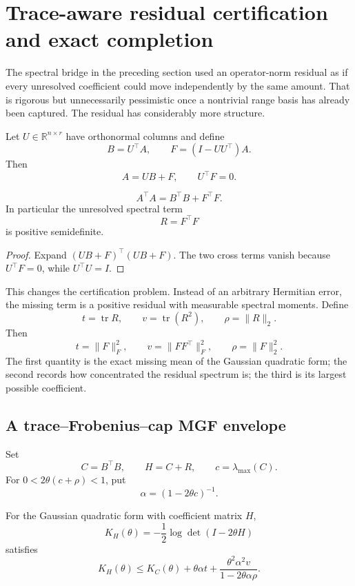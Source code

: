 \section{Trace-aware residual certification and exact completion}

The spectral bridge in the preceding section used an operator-norm residual as
if every unresolved coefficient could move independently by the same amount.
That is rigorous but unnecessarily pessimistic once a nontrivial range basis
has already been captured.  The residual has considerably more structure.

Let \(U\in\mathbb R^{n\times r}\) have orthonormal columns and define
\[
B=U^\top A,
\qquad
F=(I-UU^\top)A.
\]
Then
\[
A=UB+F,
\qquad
U^\top F=0.
\]

\begin{theorem}
\[
\boxed{
A^\top A
=
B^\top B+F^\top F.
}
\]
In particular the unresolved spectral term
\[
R=F^\top F
\]
is positive semidefinite.
\end{theorem}

\begin{proof}
Expand \((UB+F)^\top(UB+F)\).  The two cross terms vanish because
\(U^\top F=0\), while \(U^\top U=I\).
\end{proof}

This changes the certification problem.  Instead of an arbitrary Hermitian
error, the missing term is a positive residual with measurable spectral
moments.  Define
\[
t=\operatorname{tr}R,
\qquad
v=\operatorname{tr}(R^2),
\qquad
\rho=\|R\|_2.
\]
Then
\[
\boxed{
 t=\|F\|_F^2,
 \qquad
 v=\|FF^\top\|_F^2,
 \qquad
 \rho=\|F\|_2^2.
}
\]
The first quantity is the exact missing mean of the Gaussian quadratic form;
the second records how concentrated the residual spectrum is; the third is its
largest possible coefficient.

\subsection{A trace--Frobenius--cap MGF envelope}

Set
\[
C=B^\top B,
\qquad
H=C+R,
\qquad
c=\lambda_{\max}(C).
\]
For \(0<2\theta(c+\rho)<1\), put
\[
\alpha=(1-2\theta c)^{-1}.
\]

\begin{theorem}
For the Gaussian quadratic form with coefficient matrix \(H\),
\[
K_H(\theta)
=-\frac12\log\det(I-2\theta H)
\]
satisfies
\[
\boxed{
K_H(\theta)
\le
K_C(\theta)
+
\theta\alpha t
+
\frac{\theta^2\alpha^2v}
     {1-2\theta\alpha\rho}.
}
\]
\end{theorem}

